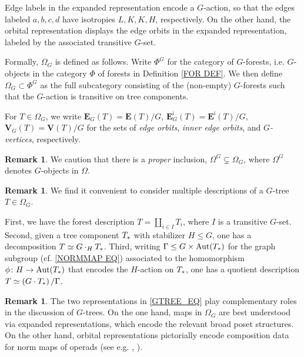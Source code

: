 \documentclass[a4paper,10pt
,draft
]{article}%
\numberwithin{equation}{section}
\numberwithin{figure}{section}
\theoremstyle{definition} %
\newtheorem{remark}[equation]{Remark}%
\DeclareMathOperator{\Aut}{Aut}%
\newcommand{\1}{\ensuremath{\mathbbm 1}}%
\begin{document}
Edge labels in the expanded representation 
encode a $G$-action, 
so that the edges labeled $a,b,c,d$
have isotropies $L,K,K,H$, respectively.
On the other hand, the orbital representation displays the edge orbits in the expanded representation,
labeled by the associated transitive $G$-set.

Formally, $\Omega_G$ is defined as follows.
Write $\Phi^G$ for the category of 
$G$-forests, i.e. $G$-objects in the category 
$\Phi$ of forests
in Definition \ref{FOR DEF}.
We then define
$\Omega_G \subset \Phi^{G}$
as the full subcategory consisting of the
(non-empty) $G$-forests
such that the $G$-action is transitive on tree components.


For $T \in \Omega_G$, we write
$\boldsymbol{E}_G(T) = \boldsymbol{E}(T)/G$, $\boldsymbol{E}^{\mathsf{i}}_G(T) = \boldsymbol{E}^{\mathsf{i}}(T)/G$,
$\boldsymbol{V}_G(T) = \boldsymbol{V}(T)/G$
for the sets of \textit{edge orbits}, \textit{inner edge orbits}, and \textit{$G$-vertices}, respectively.

\begin{remark}
	We caution that there is a 
	\emph{proper} inclusion,
	$\Omega^G \subsetneq \Omega_G$,
	where $\Omega^G$ denotes $G$-objects in $\Omega$.
\end{remark}

\begin{remark}
	We find it convenient to consider
	multiple descriptions of a $G$-tree $T\in \Omega_G$.

	First, we have the forest description
	$T = \amalg_{i \in I} T_i$,
	where $I$ is a transitive $G$-set.
%	
	Second, given a tree component $T_{\**}$
	with stabilizer $H \leq G$,
	one has a decomposition
	$T \simeq G \cdot_H T_{\**}$.
%
	Third, writing 
	$\Gamma \leq G \times \Aut(T_{\**})$
	for the graph subgroup (cf. \eqref{NORMMAP EQ})
	associated to the homomorphism 
	$\phi \colon H \to \Aut(T_{\**})$ that encodes the $H$-action on $T_{\**}$,
	one has a quotient description
	$T \simeq \left(G \cdot T_{\**}\right)/\Gamma$.
\end{remark}



\begin{remark}
	The two representations in \eqref{GTREE_EQ} 
	play complementary roles in 
	the discussion of $G$-trees.
%
	On the one hand,
	maps in $\Omega_G$ are best understood 
	via expanded representations,
	which encode the relevant broad poset structures.
%
	On the other hand, orbital representations
	pictorially encode composition data 
	for norm maps of operads
	(see e.g. \cite[Ex. 4.9]{Per18}, \cite[Rem. 3.39]{BP_edss}).
\end{remark}
\end{document}
